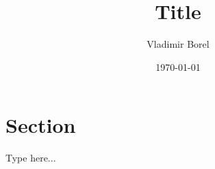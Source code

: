\documentclass{article}
\title{Title}
\author{Vladimir Borel}
\date{\today}
\begin{document}
\maketitle

\section{Section}

Type here...

\lipsum


% 

\cite{jackson}
\end{document}

